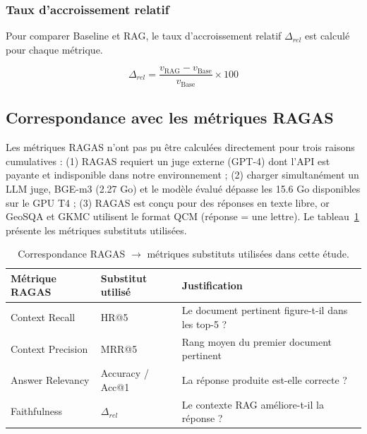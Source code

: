 \documentclass[12pt,a4paper]{article}
\begin{document}
\subsubsection{Taux d'accroissement relatif}

Pour comparer Baseline et RAG, le taux d'accroissement relatif $\Delta_{rel}$ est calcul\'e pour chaque m\'etrique.

\begin{equation}
  \Delta_{rel} = \frac{v_{\text{RAG}} - v_{\text{Base}}}{v_{\text{Base}}} \times 100
\end{equation}

\subsection{Correspondance avec les métriques RAGAS}

Les métriques RAGAS n'ont pas pu être calculées directement pour trois raisons cumulatives : (1) RAGAS requiert un juge externe (GPT-4) dont l'API est payante et indisponible dans notre environnement ; (2) charger simultanément un LLM juge, BGE-m3 (2.27 Go) et le modèle évalué dépasse les 15.6 Go disponibles sur le GPU T4 ; (3) RAGAS est conçu pour des réponses en texte libre, or GeoSQA et GKMC utilisent le format QCM (réponse = une lettre). 
Le tableau~\ref{tab:ragas} présente les métriques substituts utilisées.

\begin{table}[H]
\centering
\small
\caption{Correspondance RAGAS $\rightarrow$ métriques substituts utilisées 
dans cette étude.}
\label{tab:ragas}
\begin{tabular}{lll}
\toprule
\textbf{Métrique RAGAS} & \textbf{Substitut utilisé} & \textbf{Justification} \\
\midrule
Context Recall    & HR@5             & Le document pertinent figure-t-il dans les top-5 ? \\
Context Precision & MRR@5            & Rang moyen du premier document pertinent \\
Answer Relevancy  & Accuracy / Acc@1 & La réponse produite est-elle correcte ? \\
Faithfulness      & $\Delta_{rel}$   & Le contexte RAG améliore-t-il la réponse ? \\
\bottomrule
\end{tabular}
\end{table}

\end{document}
